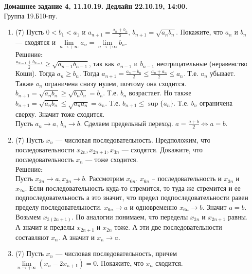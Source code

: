 \documentclass[a4paper]{article}
\begin{document}
\newcommand\HeaderDZ[5]{
\begin{center}
		\textbf{Домашнее задание #3, #2. Дедлайн #4, #5.}\\
		Группа #1.Б10-пу.\\
\end{center}
\vspace{-\baselineskip}
\bigskip
\bigskip
}



\renewcommand{\labelenumii}{\arabic{enumii})}
\renewcommand{\labelenumiii}{\roman{enumiii})}

\HeaderDZ{19}{11.10.19}{4}{22.10.19}{14:00}

\begin{enumerate}
    \item (7) Пусть $0<b_1<a_1$ и $a_{n+1} = \frac{a_n + b_n}{2}$, $b_{n+1} = \sqrt{a_nb_n}$. Покажите, что $a_n$ и $b_n$ --- сходятся и $\lim\limits_{n\to+\infty}a_n = \lim\limits_{n\to+\infty}b_n$.\\
    Решение:\\
    $\frac{a_{n-1} + b_{n-1}}{2} \ge \sqrt{a_{n-1}b_{n-1}}$, так как $a_{n-1}$ и $b_{n-1}$ неотрицательные (неравенство Коши). Тогда $a_{n} \ge b_{n}$. Тогда $a_{n+1} = \frac{a_n + b_n}{2} \le \frac{a_n + a_n}{2} \le a_n$. Т.е. $a_n$ убывает. Также $a_n$ ограничена снизу нулем, поэтому она сходится.\\
    $b_{n+1} = \sqrt{a_nb_n} \ge \sqrt{b_nb_n} = b_n$. Т.е. $b_n$ возрастает. Но также $b_{n+1} = \sqrt{a_nb_n} \le \sqrt{a_na_n} = a_n$. Т.е. $b_{n+1} \le \sup \{a_n\}$. Т.е. $b_n$ ограничена сверху. Значит тоже сходится.\\
    Пусть $a_n \rightarrow a$, $b_n \rightarrow b$. Сделаем предельный переход. $a = \frac{a+b}{2} \Leftrightarrow a = b$.  
    \item (7) Пусть $x_n$ --- числовая последовательность. Предположим, что последовательности $x_{2n}, x_{2n+1}, x_{3n}$ --- сходятся. Докажите, что последовательность $x_n$ --- тоже сходится.\\
    Решение:\\
    Пусть $x_{2n} \rightarrow a, x_{3n} \rightarrow b$. Рассмотрим $x_{6n}$. $x_{6n}$ -- последовательность и $x_{3n}$ и $x_{2n}$. Если последовательность куда-то стремится, то туда же стремится и ее подпоследовательность а это значит, что предел подпоследовательности равен пределу последовательности. $x_{6n} \rightarrow a$ и одновременно $x_{6n} \rightarrow b$. Значит $a=b$.\\
    Возьмем $x_{3(2n+1)}$. По аналогии понимаем, что переделы $x_{3n}$ и $x_{2n+1}$ равны. А значит и пределы $x_{2n+1}$ и $x_{2n}$ тоже. А эти две последовательности составляют $x_n$. А значит и $x_n \rightarrow a$.
    \item (7) Пусть $x_n$ --- числовая последовательность, причем $\lim\limits_{n\to+\infty} (x_n - 2x_{n+1}) = 0$. Покажите, что $x_n$ сходится.
    

\end{enumerate}
\end{document}
